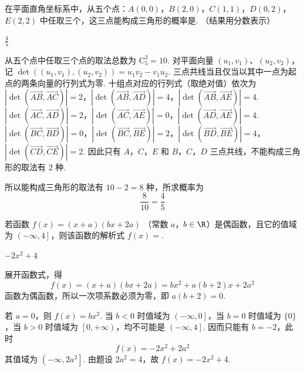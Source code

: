 \begin{problem}
在平面直角坐标系中，从五个点：\(A(0,0)\)，\(B(2,0)\)，\(C(1,1)\)，\(D(0,2)\)，\(E(2,2)\) 中任取三个，这三点能构成三角形的概率是\fillinblank{}. （结果用分数表示）
\end{problem}

\begin{answer}
\(\frac{4}{5}\)
\end{answer}

\begin{solution}
从五个点中任取三个点的取法总数为 \(\mathrm C_5^3=10\). 对平面向量 \((u_1,v_1)\)、\((u_2,v_2)\)，记 \(\det((u_1,v_1),(u_2,v_2))=u_1v_2-v_1u_2\). 三点共线当且仅当以其中一点为起点的两条向量的行列式为零. 十组点对应的行列式（取绝对值）依次为
\(|\det(\overrightarrow{AB},\overrightarrow{AC})|=2\)，\(|\det(\overrightarrow{AB},\overrightarrow{AD})|=4\)，\(|\det(\overrightarrow{AB},\overrightarrow{AE})|=4\).
\(|\det(\overrightarrow{AC},\overrightarrow{AD})|=2\)，\(|\det(\overrightarrow{AC},\overrightarrow{AE})|=0\)，\(|\det(\overrightarrow{AD},\overrightarrow{AE})|=4\).
\(|\det(\overrightarrow{BC},\overrightarrow{BD})|=0\)，\(|\det(\overrightarrow{BC},\overrightarrow{BE})|=2\)，\(|\det(\overrightarrow{BD},\overrightarrow{BE})|=4\)，\(|\det(\overrightarrow{CD},\overrightarrow{CE})|=2\).
因此只有 \(A\)，\(C\)，\(E\) 和 \(B\)，\(C\)，\(D\) 三点共线，不能构成三角形的取法有 \(2\) 种.

所以能构成三角形的取法有 \(10-2=8\) 种，所求概率为
\[
\frac{8}{10}=\frac45
\]
\end{solution}

\begin{problem}
若函数 \(f(x) = (x + a)(bx + 2a)\) （常数 \(a\)，\(b \in \R\)）是偶函数，且它的值域为 \(\left(-\infty, 4\right]\)，则该函数的解析式 \(f(x)=\)\fillinblank{}.
\end{problem}

\begin{answer}
\(-2x^2+4\)
\end{answer}

\begin{solution}
展开函数式，得
\[
f(x)=(x+a)(bx+2a)=bx^2+a(b+2)x+2a^2
\]
函数为偶函数，所以一次项系数必须为零，即 \(a(b+2)=0\).

若 \(a=0\)，则 \(f(x)=bx^2\). 当 \(b<0\) 时值域为 \(\left(-\infty,0\right]\)，当 \(b=0\) 时值域为 \(\{0\}\)，当 \(b>0\) 时值域为 \(\left[0,+\infty\right)\)，均不可能是 \(\left(-\infty,4\right]\). 因而只能有 \(b=-2\)，此时
\[
f(x)=-2x^2+2a^2
\]
其值域为 \(\left(-\infty,2a^2\right]\). 由题设 \(2a^2=4\)，故 \(f(x)=-2x^2+4\).
\end{solution}

